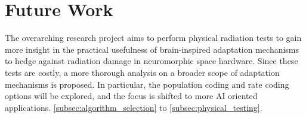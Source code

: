 \section{Future Work}\label{sec:recommendations}

The overarching research project aims to perform physical radiation tests to gain more insight in the practical usefulness of brain-inspired adaptation mechanisms to hedge against radiation damage in neuromorphic space hardware. Since these tests are costly, a more thorough analysis on a broader scope of adaptation mechanisms is proposed. In particular, the population coding and rate coding options will be explored, and the focus is shifted to more AI oriented applications. \cref{subsec:algorithm_selection} to  \cref{subsec:physical_testing}. 




